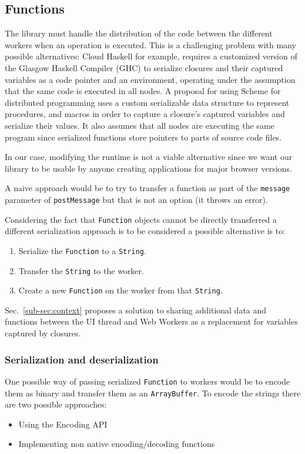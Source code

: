 \documentclass[runningheads,a4paper]{llncs}
\begin{document}
\subsection{Functions}\label{sub-sec:functions}
The library must handle the distribution of the code between the different workers when an operation is executed. This is a challenging problem with many possible alternatives: Cloud Haskell \cite{cloud-haskell} for example, requires a customized version of the Glasgow Haskell Compiler (GHC) to serialize closures and their captured variables as a code pointer and an environment, operating under the assumption that the same code is executed in all nodes. A proposal for using Scheme for distributed programming \cite{distributed-scheme} uses a custom serializable data structure to represent procedures, and macros in order to capture a closure's captured variables and serialize their values. It also assumes that all nodes are executing the same program since serialized functions store pointers to parts of source code files.

In our case, modifying the runtime is not a viable alternative since we want our library to be usable by anyone creating applications for major browser versions.

A naive approach would be to try to transfer a function as part of the \verb+message+ parameter of \verb+postMessage+ but that is not an option (it throws an error).

Considering the fact that \verb+Function+ objects cannot be directly transferred a different serialization approach is to be considered a possible alternative is to:
\begin{enumerate}
  \item Serialize the \verb+Function+ to a \verb+String+.
  \item Transfer the \verb+String+ to the worker.
  \item Create a new \verb+Function+ on the worker from that \verb+String+.
\end{enumerate}

Sec.~\ref{sub-sec:context} proposes a solution to sharing additional data and functions between the UI thread and Web Workers as a replacement for variables captured by closures.

\subsubsection{Serialization and deserialization}
One possible way of passing serialized \verb+Function+ to workers would be to encode them as binary and transfer them as an \verb+ArrayBuffer+. To encode the strings there are two possible approaches:
\begin{itemize}
  \item Using the Encoding API\cite{encoding-api}
  \item Implementing non native encoding/decoding functions
\end{itemize}
\end{document}
